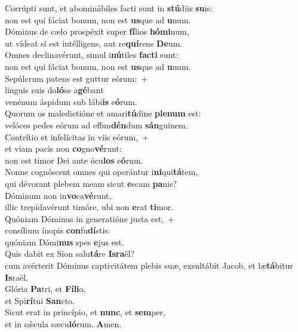 \evenverse Corrúpti sunt, et abominábiles facti sunt in \textbf{stú}diis \textbf{su}is:~\*\\
\evenverse non est qui fáciat bonum, non est \textbf{us}que ad \textbf{u}num.\\
\oddverse Dóminus de cælo prospéxit super \textbf{fí}lios \textbf{hó}\textbf{mi}num,~\*\\
\oddverse ut vídeat si est intélligens, aut re\textbf{quí}rens \textbf{De}um.\\
\evenverse Omnes declinavérunt, simul i\textbf{nú}tiles \textbf{fa}\textbf{cti} sunt:~\*\\
\evenverse non est qui fáciat bonum, non est \textbf{us}que ad \textbf{u}num.\\
\oddverse Sepúlcrum patens est guttur eórum:~+\\
\oddverse  linguis suis do\textbf{ló}se a\textbf{gé}bant~\*\\
\oddverse venénum áspidum sub lábi\textbf{is} e\textbf{ó}rum.\\
\evenverse Quorum os maledictióne et amari\textbf{tú}dine \textbf{ple}\textbf{num} est:~\*\\
\evenverse velóces pedes eórum ad effun\textbf{dén}dum \textbf{sán}guinem.\\
\oddverse Contrítio et infelícitas in viis eórum,~+\\
\oddverse  et viam pacis non \textbf{co}gno\textbf{vé}runt:~\*\\
\oddverse non est timor Dei ante ócu\textbf{los} e\textbf{ó}rum.\\
\evenverse Nonne cognóscent omnes qui operántur i\textbf{ni}qui\textbf{tá}tem,~\*\\
\evenverse qui dévorant plebem meam sicut \textbf{e}scam \textbf{pa}nis?\\
\oddverse Dóminum non in\textbf{vo}ca\textbf{vé}runt,~\*\\
\oddverse illic trepidavérunt timóre, ubi non \textbf{e}rat \textbf{ti}mor.\\
\evenverse Quóniam Dóminus in generatióne justa est,~+\\
\evenverse  consílium ínopis \textbf{con}fu\textbf{dí}stis:~\*\\
\evenverse quóniam Dómi\textbf{nus} spes \textbf{e}jus est.\\
\oddverse Quis dabit ex Sion salu\textbf{tá}re \textbf{Is}\textbf{ra}ël?~\*\\
\oddverse cum avérterit Dóminus captivitátem plebis suæ, exsultábit Jacob, et læ\textbf{tá}bitur \textbf{Is}raël.\\
\evenverse Glória \textbf{Pa}tri, et \textbf{Fí}\textbf{li}o,~\*\\
\evenverse et Spi\textbf{rí}tui \textbf{San}cto.\\
\oddverse Sicut erat in princípio, et \textbf{nunc}, et \textbf{sem}per,~\*\\
\oddverse et in sǽcula sæcu\textbf{ló}rum. \textbf{A}men.\\
